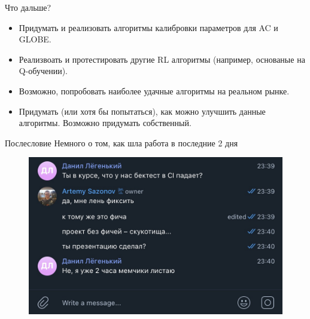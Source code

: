 \documentclass[aspectratio=169]{beamer}
\begin{document}
    \begin{frame}{Что дальше?}
        \begin{itemize}
            \item Придумать и реализовать алгоритмы калибровки параметров для AC и GLOBE.
            \item Реализвоать и протестировать другие RL алгоритмы (например, основаные на Q-обучении).
            \item Возможно, попробовать наиболее удачные алгоритмы на реальном рынке. 
            \item Придумать (или хотя бы попытаться), как можно улучшить данные алгоритмы. Возможно придумать собственный.
        \end{itemize}
    \end{frame}

    \begin{frame}{Послесловие}
        Немного о том, как шла работа в последние 2 дня

        \begin{figure}  
            \centering
            \includegraphics[width=0.83\linewidth]{workflow.jpeg}
        \end{figure}
    \end{frame}

    

    
\end{document}
